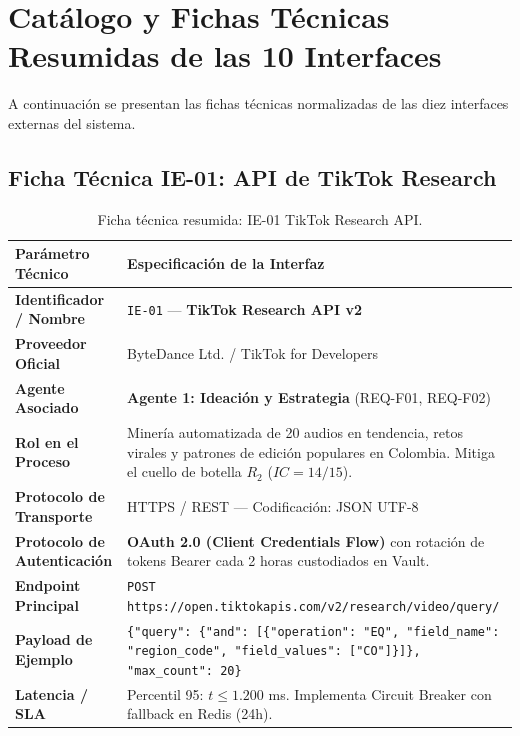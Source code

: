 \documentclass[11pt,a4paper]{article}
\begin{document}
\newpage
\section{Catálogo y Fichas Técnicas Resumidas de las 10 Interfaces}\label{sec:fichas}

A continuación se presentan las fichas técnicas normalizadas de las diez interfaces externas del sistema.

\subsection{Ficha Técnica IE-01: API de TikTok Research}\label{sec:ie01}
\begin{table}[h!]
\centering
\small
\begin{tabular}{p{4.5cm} p{11cm}}
\toprule
\textbf{Parámetro Técnico} & \textbf{Especificación de la Interfaz} \\
\midrule
\textbf{Identificador / Nombre} & \texttt{IE-01} --- \textbf{TikTok Research API v2} \\
\textbf{Proveedor Oficial} & ByteDance Ltd. / TikTok for Developers \\
\textbf{Agente Asociado} & \textbf{Agente 1: Ideación y Estrategia} (REQ-F01, REQ-F02) \\
\textbf{Rol en el Proceso} & Minería automatizada de 20 audios en tendencia, retos virales y patrones de edición populares en Colombia. Mitiga el cuello de botella $R_2$ ($IC=14/15$). \\
\textbf{Protocolo de Transporte} & HTTPS / REST --- Codificación: JSON UTF-8 \\
\textbf{Protocolo de Autenticación} & \textbf{OAuth 2.0 (Client Credentials Flow)} con rotación de tokens Bearer cada 2 horas custodiados en Vault. \\
\textbf{Endpoint Principal} & \texttt{POST https://open.tiktokapis.com/v2/research/video/query/} \\
\textbf{Payload de Ejemplo} & \texttt{\{"query": \{"and": [\{"operation": "EQ", "field\_name": "region\_code", "field\_values": ["CO"]\}]\}, "max\_count": 20\}} \\
\textbf{Latencia / SLA} & Percentil 95: $t \le 1.200$ ms. Implementa Circuit Breaker con fallback en Redis (24h). \\
\bottomrule
\end{tabular}
\caption{Ficha técnica resumida: IE-01 TikTok Research API.}
\end{table}
\end{document}
